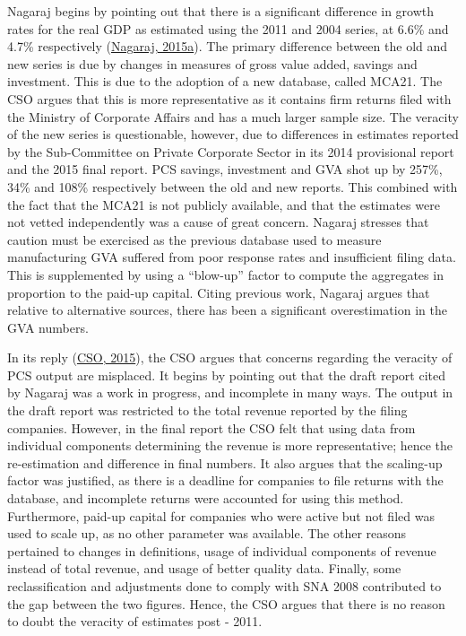 \documentclass[12pt,nobind, a4paper]{reedthesis}
\begin{document}
 Nagaraj begins by pointing out that there is a significant difference in growth rates for the real GDP as estimated using the 2011 and 2004 series, at 6.6\% and 4.7\% respectively (\protect\hyperlink{ref-nagaraj_seeds_2015-1}{Nagaraj, 2015a}). The primary difference between the old and new series is due by changes in measures of gross value added, savings and investment. This is due to the adoption of a new database, called MCA21. The CSO argues that this is more representative as it contains firm returns filed with the Ministry of Corporate Affairs and has a much larger sample size. The veracity of the new series is questionable, however, due to differences in estimates reported by the Sub-Committee on Private Corporate Sector in its 2014 provisional report and the 2015 final report. PCS savings, investment and GVA shot up by 257\%, 34\% and 108\% respectively between the old and new reports. This combined with the fact that the MCA21 is not publicly available, and that the estimates were not vetted independently was a cause of great concern. Nagaraj stresses that caution must be exercised as the previous database used to measure manufacturing GVA suffered from poor response rates and insufficient filing data. This is supplemented by using a ``blow-up'' factor to compute the aggregates in proportion to the paid-up capital. Citing previous work, Nagaraj argues that relative to alternative sources, there has been a significant overestimation in the GVA numbers.
 \linebreak

 In its reply (\protect\hyperlink{ref-cso_no_2015}{CSO, 2015}), the CSO argues that concerns regarding the veracity of PCS output are misplaced. It begins by pointing out that the draft report cited by Nagaraj was a work in progress, and incomplete in many ways. The output in the draft report was restricted to the total revenue reported by the filing companies. However, in the final report the CSO felt that using data from individual components determining the revenue is more representative; hence the re-estimation and difference in final numbers. It also argues that the scaling-up factor was justified, as there is a deadline for companies to file returns with the database, and incomplete returns were accounted for using this method. Furthermore, paid-up capital for companies who were active but not filed was used to scale up, as no other parameter was available. The other reasons pertained to changes in definitions, usage of individual components of revenue instead of total revenue, and usage of better quality data. Finally, some reclassification and adjustments done to comply with SNA 2008 contributed to the gap between the two figures. Hence, the CSO argues that there is no reason to doubt the veracity of estimates post - 2011.
 \linebreak
\end{document}
